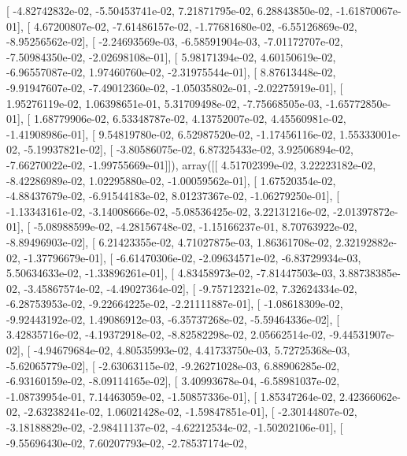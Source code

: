 \documentclass{article}
\begin{document}
       [ -4.82742832e-02,  -5.50453741e-02,   7.21871795e-02,
          6.28843850e-02,  -1.61870067e-01],
       [  4.67200807e-02,  -7.61486157e-02,  -1.77681680e-02,
         -6.55126869e-02,  -8.95256562e-02],
       [ -2.24693569e-03,  -6.58591904e-03,  -7.01172707e-02,
         -7.50984350e-02,  -2.02698108e-01],
       [  5.98171394e-02,   4.60150619e-02,  -6.96557087e-02,
          1.97460760e-02,  -2.31975544e-01],
       [  8.87613448e-02,  -9.91947607e-02,  -7.49012360e-02,
         -1.05035802e-01,  -2.02275919e-01],
       [  1.95276119e-02,   1.06398651e-01,   5.31709498e-02,
         -7.75668505e-03,  -1.65772850e-01],
       [  1.68779906e-02,   6.53348787e-02,   4.13752007e-02,
          4.45560981e-02,  -1.41908986e-01],
       [  9.54819780e-02,   6.52987520e-02,  -1.17456116e-02,
          1.55333001e-02,  -5.19937821e-02],
       [ -3.80586075e-02,   6.87325433e-02,   3.92506894e-02,
         -7.66270022e-02,  -1.99755669e-01]]), array([[  4.51702399e-02,   3.22223182e-02,  -8.42286989e-02,
          1.02295880e-02,  -1.00059562e-01],
       [  1.67520354e-02,  -4.88437679e-02,  -6.91544183e-02,
          8.01237367e-02,  -1.06279250e-01],
       [ -1.13343161e-02,  -3.14008666e-02,  -5.08536425e-02,
          3.22131216e-02,  -2.01397872e-01],
       [ -5.08988599e-02,  -4.28156748e-02,  -1.15166237e-01,
          8.70763922e-02,  -8.89496903e-02],
       [  6.21423355e-02,   4.71027875e-03,   1.86361708e-02,
          2.32192882e-02,  -1.37796679e-01],
       [ -6.61470306e-02,  -2.09634571e-02,  -6.83729934e-03,
          5.50634633e-02,  -1.33896261e-01],
       [  4.83458973e-02,  -7.81447503e-03,   3.88738385e-02,
         -3.45867574e-02,  -4.49027364e-02],
       [ -9.75712321e-02,   7.32624334e-02,  -6.28753953e-02,
         -9.22664225e-02,  -2.21111887e-01],
       [ -1.08618309e-02,  -9.92443192e-02,   1.49086912e-03,
         -6.35737268e-02,  -5.59464336e-02],
       [  3.42835716e-02,  -4.19372918e-02,  -8.82582298e-02,
          2.05662514e-02,  -9.44531907e-02],
       [ -4.94679684e-02,   4.80535993e-02,   4.41733750e-03,
          5.72725368e-03,  -5.62065779e-02],
       [ -2.63063115e-02,  -9.26271028e-03,   6.88906285e-02,
         -6.93160159e-02,  -8.09114165e-02],
       [  3.40993678e-04,  -6.58981037e-02,  -1.08739954e-01,
          7.14463059e-02,  -1.50857336e-01],
       [  1.85347264e-02,   2.42366062e-02,  -2.63238241e-02,
          1.06021428e-02,  -1.59847851e-01],
       [ -2.30144807e-02,  -3.18188829e-02,  -2.98411137e-02,
         -4.62212534e-02,  -1.50202106e-01],
       [ -9.55696430e-02,   7.60207793e-02,  -2.78537174e-02,
\end{document}
